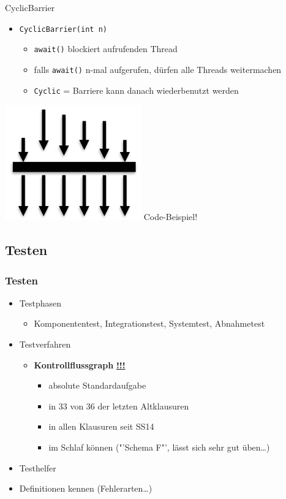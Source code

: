 \documentclass[18pt]{beamer}
\begin{document}
	\begin{frame}{CyclicBarrier}
		\begin{itemize}
			\item \texttt{CyclicBarrier(int n)}
			\begin{itemize}
				\item \texttt{await()} blockiert aufrufenden Thread
				\item falls \texttt{await()} n-mal aufgerufen, dürfen alle Threads weitermachen
				\item \texttt{Cyclic} = Barriere kann danach wiederbenutzt werden
			\end{itemize}
		\end{itemize}
		\centering \includegraphics[scale=0.5]{pics/tut6/cyclic.png}
		\pause
		Code-Beispiel!
	\end{frame}
	
	\subsection{Testen}
	\begin{frame}
		\frametitle{Testen}
		\begin{itemize}
			\item Testphasen 
			\begin{itemize}
				\item Komponententest, Integrationstest, Systemtest, Abnahmetest \pause
			\end{itemize}
			\item Testverfahren
			\begin{itemize}
				\item \textbf{Kontrollflussgraph} \pause \textbf{\underline{!!!}}
				\begin{itemize}
					\item absolute Standardaufgabe \pause
					\item in 33 von 36 der letzten Altklausuren
					\item in allen Klausuren seit SS14
					\item im Schlaf können ("'Schema F"', lässt sich sehr gut üben\dots)
				\end{itemize}
			\end{itemize} \pause
			\item Testhelfer
			\item Definitionen kennen (Fehlerarten\dots)
		\end{itemize}
	\end{frame}
\end{document}
